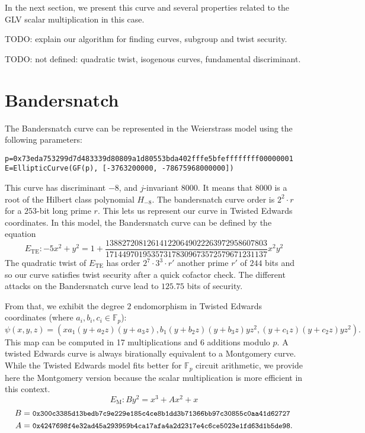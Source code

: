 \documentclass{amsart}
\newcommand{\SM}[1]{\color{blue}#1\color{black}}
\newcommand{\Fp}{\ensuremath{\mathbb F_p}}
\begin{document}
In the next section, we present this curve and several properties
related to the  GLV scalar multiplication in this case.

\SM{TODO: explain our algorithm for finding curves, subgroup and twist
  security.}

\SM{TODO: not defined: quadratic twist, isogenous curves, fundamental
  discriminant.}

\section{Bandersnatch} 

The Bandersnatch curve can be represented in the Weierstrass model
using the following parameters:
\begin{verbatim}
p=0x73eda753299d7d483339d80809a1d80553bda402fffe5bfeffffffff00000001
E=EllipticCurve(GF(p), [-3763200000, -78675968000000])
\end{verbatim}
This curve has discriminant $-8$, and $j$-invariant $8000$. It means
that $8000$ is a root of the Hilbert class polynomial $H_{-8}$.
The bandersnatch curve order is $2^2\cdot r$ for a $253$-bit long
prime $r$.
This lets us represent our curve in Twisted Edwards coordinates.
In this model, the Bandersnatch curve can be defined by the equation
$$E_\text{TE}:-5x^2+y^2 = 1 + \frac{138827208126141220649022263972958607803}{171449701953573178309673572579671231137}x^2y^2$$ 
The quadratic twist of $E_\text{TE}$ has order $2^7 \cdot 3^3 \cdot r'$ another
prime $r'$ of $244$ bits
and so our curve satisfies twist security after a quick cofactor
check.
The different attacks on the Bandersnatch curve lead to $125.75$ bits
of security.

From that, we exhibit the degree $2$ endomorphism in Twisted Edwards
coordinates (where $a_i, b_i, c_i \in \Fp$):
$$\psi(x,y,z) = (xa_1(y+a_2z)(y+a_3z), b_1(y+b_2z)(y+b_3z)yz^2,
(y+c_1z)(y+c_2z)yz^2).$$
This map can be computed in 17 multiplications and 6 additions modulo $p$.
A twisted Edwards curve is always birationally equivalent to a
Montgomery curve.
While the Twisted Edwards model fits better for $\mathbb F_p$ circuit
arithmetic, we provide here the Montgomery version because the scalar
multiplication is more efficient in this context.
$$E_\text{M}: By^2 = x^3 + Ax^2 + x$$
\begin{align*}
  B &= \text{\small{\tt 0x300c3385d13bedb7c9e229e185c4ce8b1dd3b71366bb97c30855c0aa41d62727}}\\
  A &= \text{\small{\tt 0x4247698f4e32ad45a293959b4ca17afa4a2d2317e4c6ce5023e1fd63d1b5de98}}.
\end{align*}
\end{document}
